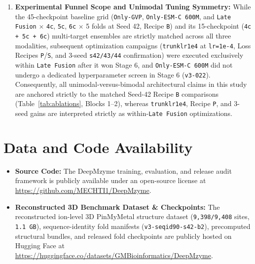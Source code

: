 \documentclass[10pt,a4paper,twocolumn]{article}
\begin{document}
\begin{enumerate}
  \item \textbf{Experimental Funnel Scope and Unimodal Tuning Symmetry:} While the 45-checkpoint baseline grid (\texttt{Only-GVP}, \texttt{Only-ESM-C 600M}, and \texttt{Late Fusion} $\times$ \texttt{4c}, \texttt{5c}, \texttt{6c} $\times$ 5 folds at Seed 42, Recipe \texttt{B}) and its 15-checkpoint (\texttt{4c + 5c + 6c}) multi-target ensembles are strictly matched across all three modalities, subsequent optimization campaigns (\texttt{trunklr1e4} at \texttt{lr=1e-4}, Loss Recipes \texttt{P}/\texttt{S}, and 3-seed \texttt{s42/43/44} confirmation) were executed exclusively within \texttt{Late Fusion} after it won Stage 6, and \texttt{Only-ESM-C 600M} did not undergo a dedicated hyperparameter screen in Stage 6 (\texttt{v3-022}). Consequently, all unimodal-versus-bimodal architectural claims in this study are anchored strictly to the matched Seed-42 Recipe \texttt{B} comparisons (Table~\ref{tab:ablations}, Blocks 1--2), whereas \texttt{trunklr1e4}, Recipe \texttt{P}, and 3-seed gains are interpreted strictly as within-\texttt{Late Fusion} optimizations.
\end{enumerate}

\section{Data and Code Availability}

\begin{itemize}
  \item \textbf{Source Code:} The DeepMzyme training, evaluation, and release audit framework is publicly available under an open-source license at \url{https://github.com/MECHTI1/DeepMzyme}.
  \item \textbf{Reconstructed 3D Benchmark Dataset \& Checkpoints:} The reconstructed ion-level 3D PinMyMetal structure dataset (\texttt{9,398/9,408} sites, \texttt{1.1 GB}), sequence-identity fold manifests (\texttt{v3-seqid90-s42-b2}), precomputed structural bundles, and released fold checkpoints are publicly hosted on Hugging Face at \url{https://huggingface.co/datasets/GMBioinformatics/DeepMzyme}.
\end{itemize}



\end{document}
